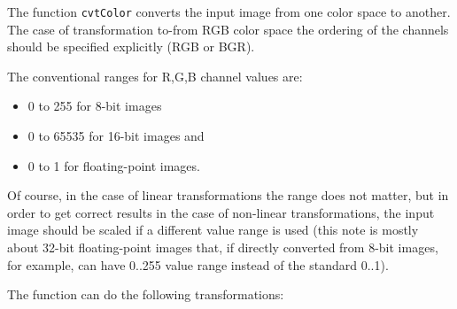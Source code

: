 The function \texttt{cvtColor} converts the input image from one color
space to another. The case of transformation to-from RGB color space the ordering of the channels should be specified explicitly (RGB or BGR).

The conventional ranges for R,G,B channel values are:

\begin{itemize}
 \item 0 to 255 for 8-bit images
 \item 0 to 65535 for 16-bit images and
 \item 0 to 1 for floating-point images.
\end{itemize}

Of course, in the case of linear transformations the range does not matter,
but in order to get correct results in the case of non-linear
transformations, the input image should be scaled if a different value range is used (this note is mostly about 32-bit floating-point images that, if directly converted from 8-bit images, for example, can have 0..255 value range instead of the standard 0..1).

The function can do the following transformations:

